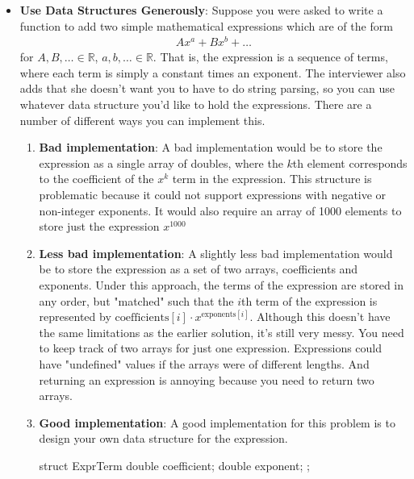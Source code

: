 \documentclass{report}
\begin{document}
\begin{itemize}
\begin{itemize}
                    \bigbreak \noindent 
                    Striving for these aspects requires a balancing act. For example, it's often advisable to sacrifice some degree of efficiency to make code more maintainable, and vice versa.
                    \bigbreak \noindent 
                    You should think about these elements as you code during an interview. The following aspects of code are more specific ways to demonstrate the earlier list.
            \end{itemize}
        \item \textbf{Use Data Structures Generously}: Suppose you were asked to write a function to add two simple mathematical expressions which are of the form
            \begin{align*}
                Ax^{a} + Bx^{b} + \dots
            \end{align*}
            for $A,B,\dots  \in \mathbb{R}$, $a,b,\dots \in \mathbb{R}$. That is, the expression is a sequence of terms, where each term is simply a constant times an exponent. The interviewer also adds that she doesn't want you to have to do string parsing, so you can use whatever data structure you'd like to hold the expressions.
            \bigbreak \noindent 
            There are a number of different ways you can implement this.
            \begin{enumerate}
                \item \textbf{Bad implementation}: A  bad implementation would be to store the expression as a single array of doubles, where the $k$th element corresponds to the coefficient of the $x^{k}$ term in the expression. This structure is problematic because it could not support expressions with negative or non-integer exponents. It would also require an array of 1000 elements to store just the expression $x^{1000}$
                \item \textbf{Less bad implementation}:  A slightly less bad implementation would be to store the expression as a set of two arrays, coefficients and exponents. Under this approach, the terms of the expression are stored in any order, but "matched" such that the $i$th term of the expression is represented by $\text{coefficients}[i] \cdot x^{\text{exponents}[i]}$.
                    \bigbreak \noindent 
                    Although this doesn't have the same limitations as the earlier solution, it's still very messy. You need to keep track of two arrays for just one expression. Expressions could have "undefined" values if the arrays were of different lengths. And returning an expression is annoying because you need to return two arrays.
                \item \textbf{Good implementation}: A good implementation for this problem is to design your own data structure for the expression.
                    \bigbreak \noindent 
                    \begin{cppcode}
                        struct ExprTerm {
                            double coefficient;
                            double exponent;
                        };


\end{cppcode}
\end{enumerate}
\end{itemize}
\end{document}
